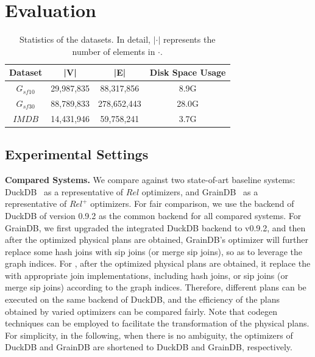 \section{Evaluation}

\begin{table}[t]
    \centering
    \begin{tabular}{c|c|c|c}
    \hline
    Dataset & |V| & |E| & Disk Space Usage\\ 
    \hline
    $G_{sf10}$& 29,987,835 & 88,317,856 & 8.9G \\
    \hline
    $G_{sf30}$ & 88,789,833 & 278,652,443 & 28.0G\\
    \hline
    $IMDB$ & 14,431,946 & 59,758,241 & 3.7G \\
    \hline
    \end{tabular}
    \caption{Statistics of the datasets. In detail, $|\cdot|$ represents the number of elements in $\cdot$.}
    \label{table:experiment-datasets}
\end{table}

\subsection{Experimental Settings}
\label{sec:experiment-settings}
\noindent\textbf{Compared Systems. }
We compare \relgo against two state-of-art baseline systems: DuckDB~\cite{duckdb} as a representative of $Rel$ optimizers, and GrainDB~\cite{graindb} as a representative of $Rel^+$ optimizers.
For fair comparison, we use the backend of DuckDB of version 0.9.2 as the common backend for all compared systems. 
For GrainDB, we first upgraded the integrated DuckDB backend to v0.9.2, and then after the optimized physical plans are obtained, GrainDB's optimizer will further replace some hash joins with sip joins (or merge sip joins), so as to leverage the graph indices.
For \relgo, after the optimized physical plans are obtained, it replace the  with appropriate join implementations, including hash joins, or sip joins (or merge sip joins) according to the graph indices.
Therefore, different plans can be executed on the same backend of DuckDB, and the efficiency of the plans obtained by varied optimizers can be compared fairly.
Note that codegen techniques can be employed to facilitate the transformation of the physical plans.
For simplicity, in the following, when there is no ambiguity, the optimizers of DuckDB and GrainDB are shortened to DuckDB and GrainDB, respectively.


